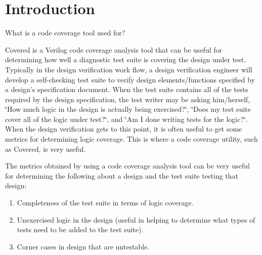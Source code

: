 \section{Introduction}\label{page_intro}
 \begin{Desc}
\item[What is a code coverage tool used for?]\par
 Covered is a Verilog code coverage analysis tool that can be useful for determining how well a diagnostic test suite is covering the design under test. Typically in the design verification work flow, a design verification engineer will develop a self-checking test suite to verify design elements/functions specified by a design's specification document. When the test suite contains all of the tests required by the design specification, the test writer may be asking him/herself, \char`\"{}How much logic in the design is actually being exercised?\char`\"{}, \char`\"{}Does my test suite cover all of the logic under test?\char`\"{}, and \char`\"{}Am I done writing tests for the logic?\char`\"{}. When the design verification gets to this point, it is often useful to get some metrics for determining logic coverage. This is where a code coverage utility, such as Covered, is very useful.

 The metrics obtained by using a code coverage analysis tool can be very useful for determining the following about a design and the test suite testing that design:\begin{enumerate}
\item 
Completeness of the test suite in terms of logic coverage.\item 
Unexercised logic in the design (useful in helping to determine what types of tests need to be added to the test suite).\item 
Corner cases in design that are untestable.\end{enumerate}
\end{Desc}


